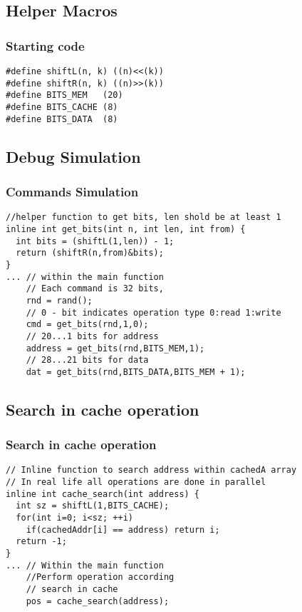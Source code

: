 \documentclass{beamer}
\begin{document}
\subsection{Helper Macros}
\begin{frame}[fragile]
\frametitle{ Starting code }
\begin{example}
\begin{lstlisting}
#define shiftL(n, k) ((n)<<(k))
#define shiftR(n, k) ((n)>>(k))
#define BITS_MEM   (20)
#define BITS_CACHE (8)
#define BITS_DATA  (8)
\end{lstlisting}
\end{example}
\end{frame}
\subsection{Debug Simulation}
\begin{frame}[fragile]
\frametitle{ Commands Simulation }
\begin{example}
\begin{lstlisting}
//helper function to get bits, len shold be at least 1
inline int get_bits(int n, int len, int from) {
  int bits = (shiftL(1,len)) - 1;
  return (shiftR(n,from)&bits);
}
... // within the main function
    // Each command is 32 bits,
    rnd = rand();
    // 0 - bit indicates operation type 0:read 1:write
    cmd = get_bits(rnd,1,0);
    // 20...1 bits for address
    address = get_bits(rnd,BITS_MEM,1);
    // 28...21 bits for data
    dat = get_bits(rnd,BITS_DATA,BITS_MEM + 1);
\end{lstlisting}
\end{example}
\end{frame}
\subsection{Search in cache operation}
\begin{frame}[fragile]
\frametitle{Search in cache operation}
\begin{example}
\begin{lstlisting}
// Inline function to search address within cachedA array
// In real life all operations are done in parallel
inline int cache_search(int address) {
  int sz = shiftL(1,BITS_CACHE);
  for(int i=0; i<sz; ++i)
    if(cachedAddr[i] == address) return i;
  return -1;
}
... // Within the main function    
    //Perform operation according
    // search in cache
    pos = cache_search(address);
\end{lstlisting}
\end{example}
\end{frame}
\end{document}
